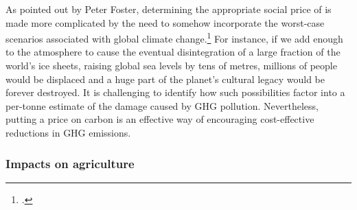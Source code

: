 As pointed out by Peter Foster, determining the appropriate social price of  is made more complicated by the need to somehow incorporate the worst-case scenarios associated with global climate change.\footcite[][]{ApocExternal}
For instance, if we add enough  to the atmosphere to cause the eventual disintegration of a large fraction of the world's ice sheets, raising global sea levels by tens of metres, millions of people would be displaced and a huge part of the planet's cultural legacy would be forever destroyed.
It is challenging to identify how such possibilities factor into a per-tonne estimate of the damage caused by GHG pollution.
Nevertheless, putting a price on carbon is an effective way of encouraging cost-effective reductions in GHG emissions.



	\subsubsection{Impacts on agriculture}



